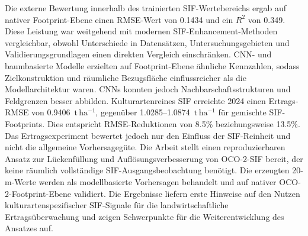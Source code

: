 Die externe Bewertung innerhalb des trainierten SIF-Wertebereichs ergab auf nativer Footprint-Ebene einen RMSE-Wert von 0.1434 und ein $R^2$ von 0.349. Diese Leistung war weitgehend mit modernen SIF-Enhancement-Methoden vergleichbar, obwohl Unterschiede in Datensätzen, Untersuchungsgebieten und Validierungsgrundlagen einen direkten Vergleich einschränken.
CNN- und baumbasierte Modelle erzielten auf Footprint-Ebene ähnliche Kennzahlen, sodass Zielkonstruktion und räumliche Bezugsfläche einflussreicher als die Modellarchitektur waren. CNNs konnten jedoch Nachbarschaftsstrukturen und Feldgrenzen besser abbilden. Kulturartenreines SIF erreichte 2024 einen Ertrags-RMSE von 0.9406~$\mathrm{t\,ha^{-1}}$, gegenüber 1.0285--1.0874~$\mathrm{t\,ha^{-1}}$ für gemischte SIF-Footprints. Dies entspricht RMSE-Reduktionen von 8.5\% beziehungsweise 13.5\%. Das Ertragsexperiment bewertet jedoch nur den Einfluss der SIF-Reinheit und nicht die allgemeine Vorhersagegüte. Die Arbeit stellt einen reproduzierbaren Ansatz zur Lückenfüllung und Auflösungsverbesserung von OCO-2-SIF bereit, der keine räumlich vollständige SIF-Ausgangsbeobachtung benötigt. Die erzeugten 20-m-Werte werden als modellbasierte Vorhersagen behandelt und auf nativer OCO-2-Footprint-Ebene validiert. Die Ergebnisse liefern erste Hinweise auf den Nutzen kulturartenspezifischer SIF-Signale für die landwirtschaftliche Ertragsüberwachung und zeigen Schwerpunkte für die Weiterentwicklung des Ansatzes auf.